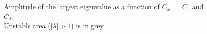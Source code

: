\documentclass[a4paper,11pt]{article}
\begin{document}
\begin{figure}[!ht]
   \centering
   \quad
   \\
   \quad
   \\
   \caption {Amplitude of the largest eigenvalue as a function of $C_x\ =\ C_z$ and $C_\lambda$.\\
   Unstable area ($\mid\lambda\mid >1$) is in grey. }
   \label{Figstabcs}
\end{figure}
\end{document}
